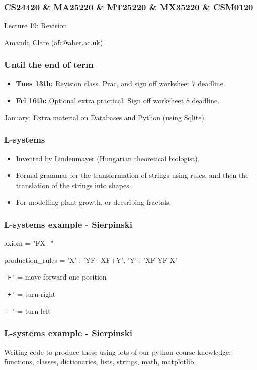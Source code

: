 \documentclass{beamer}
\begin{document}
\begin{frame}
\frametitle{CS24420 \& MA25220 \& MT25220 \& MX35220 \& CSM0120}

\begin{center}
\begin{huge}
Lecture 19: Revision
\end{huge}
\bigskip

Amanda Clare (afc@aber.ac.uk)

\end{center}
\end{frame}

\begin{frame}[fragile]
\frametitle{Until the end of term}
\begin{itemize}
\item \textbf{Tues 13th:} Revision class. Prac, and sign off worksheet 7 deadline.
\item \textbf{Fri 16th:} Optional extra practical. Sign off worksheet 8 deadline.
\end{itemize}
January: Extra material on Databases and Python (using Sqlite).
\end{frame}

\begin{frame}[fragile]
\frametitle{L-systems}
\begin{itemize}
\item  Invented by Lindenmayer (Hungarian theoretical biologist).

\item Formal grammar for the transformation of strings using rules, and then
the translation of the strings into shapes.

\item For modelling plant growth, or decsribing fractals.
\end{itemize}
\end{frame}

\begin{frame}[fragile]
\frametitle{L-systems example - Sierpinski}
\begin{code}
axiom = "FX+"

production_rules = {
   'X' : 'YF+XF+Y',
   'Y' : 'XF-YF-X'
}
\end{code}

\lstinline|'F'| = move forward one position

\lstinline|'+'| = turn right

\lstinline|'-'| = turn left
\end{frame}

\begin{frame}[fragile]
\frametitle{L-systems example - Sierpinski}
Writing code to produce these using lots of our python course
knowledge: functions, classes, dictionaries,
lists, strings, math, matplotlib.
\end{frame}
\end{document}
